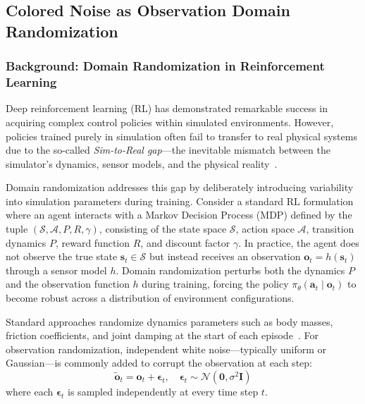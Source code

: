 %

\subsection{Colored Noise as Observation Domain Randomization}
\label{sec:obs_colored_noise}

\subsubsection{Background: Domain Randomization in Reinforcement Learning}

Deep reinforcement learning (RL) has demonstrated remarkable success in acquiring complex control policies within simulated environments.
However, policies trained purely in simulation often fail to transfer to real physical systems due to the so-called \emph{Sim-to-Real gap}---the inevitable mismatch between the simulator's dynamics, sensor models, and the physical reality~\cite{tobin2017domain,peng2018sim}.

Domain randomization addresses this gap by deliberately introducing variability into simulation parameters during training.
Consider a standard RL formulation where an agent interacts with a Markov Decision Process (MDP) defined by the tuple $(\mathcal{S}, \mathcal{A}, P, R, \gamma)$, consisting of the state space $\mathcal{S}$, action space $\mathcal{A}$, transition dynamics $P$, reward function $R$, and discount factor $\gamma$.
In practice, the agent does not observe the true state $\boldsymbol{s}_t \in \mathcal{S}$ but instead receives an observation $\boldsymbol{o}_t = h(\boldsymbol{s}_t)$ through a sensor model $h$.
Domain randomization perturbs both the dynamics $P$ and the observation function $h$ during training, forcing the policy $\pi_\theta(\boldsymbol{a}_t \mid \boldsymbol{o}_t)$ to become robust across a distribution of environment configurations.

Standard approaches randomize dynamics parameters such as body masses, friction coefficients, and joint damping at the start of each episode~\cite{tobin2017domain}.
For observation randomization, independent white noise---typically uniform or Gaussian---is commonly added to corrupt the observation at each step:
\begin{equation}
  \tilde{\boldsymbol{o}}_t = \boldsymbol{o}_t + \boldsymbol{\epsilon}_t, \quad
  \boldsymbol{\epsilon}_t \sim \mathcal{N}(\boldsymbol{0}, \sigma^2 \boldsymbol{I})
  \label{eq:white_noise}
\end{equation}
where each $\boldsymbol{\epsilon}_t$ is sampled independently at every time step $t$.

